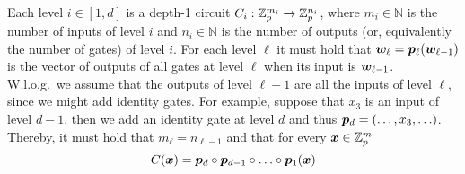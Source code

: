 Each level $i \in[1,d]$ is a depth-1 circuit $C_i:\mathbb{Z}_p^{m_{i}} \to \mathbb{Z}_p^{n_i}$, where $m_i \in\mathbb{N}$ is the number of inputs of level $i$ and $n_i \in\mathbb{N}$ is the number of outputs (or, equivalently the number of gates) of level $i$. %
For each level $\ell$ it must hold that ${\boldsymbol{w}}_\ell={\boldsymbol{p}}_\ell({\boldsymbol{w}}_{\ell-1})$ is the vector of outputs of all gates at level $\ell$ when its input is ${\boldsymbol{w}}_{\ell-1}$.
W.l.o.g.~we assume that the outputs of level $\ell-1$ are all the inputs of level $\ell$, since we might add identity gates. For example, suppose that $x_3$ is an input of level $d-1$, then we add an identity gate at level $d$ and thus ${\boldsymbol{p}}_d=(\ldots,x_3,\ldots)$.
 Thereby, it must hold that $ m_\ell = n_{\ell-1}$ and that for every ${\boldsymbol{x}}\in\mathbb{Z}_p^m$
$$
C({\boldsymbol{x}}) = {\boldsymbol{p}}_{d}\circ{\boldsymbol{p}}_{d-1}\circ\ldots\circ {\boldsymbol{p}}_1 ({\boldsymbol{x}})
$$

